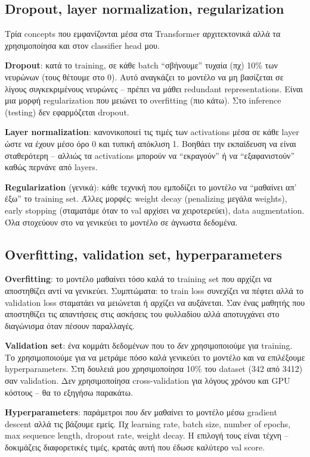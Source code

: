 \documentclass[12pt]{fphw}
\begin{document}
\subsection{Dropout, layer normalization, regularization}

Τρία concepts που εμφανίζονται μέσα στα Transformer αρχιτεκτονικά αλλά τα χρησιμοποίησα και στον classifier head μου.

\textbf{Dropout}: κατά το training, σε κάθε batch ``σβήνουμε'' τυχαία (πχ) 10\% των νευρώνων (τους θέτουμε στο 0). Αυτό αναγκάζει το μοντέλο να μη βασίζεται σε λίγους συγκεκριμένους νευρώνες -- πρέπει να μάθει redundant representations. Είναι μια μορφή regularization που μειώνει το overfitting (πιο κάτω). Στο inference (testing) δεν εφαρμόζεται dropout.

\textbf{Layer normalization}: κανονικοποιεί τις τιμές των activations μέσα σε κάθε layer ώστε να έχουν μέσο όρο 0 και τυπική απόκλιση 1. Βοηθάει την εκπαίδευση να είναι σταθερότερη -- αλλιώς τα activations μπορούν να ``εκραγούν'' ή να ``εξαφανιστούν'' καθώς περνάνε από layers.

\textbf{Regularization} (γενικά): κάθε τεχνική που εμποδίζει το μοντέλο να ``μαθαίνει απ' έξω'' το training set. Άλλες μορφές: weight decay (penalizing μεγάλα weights), early stopping (σταματάμε όταν το val αρχίσει να χειροτερεύει), data augmentation. Όλα στοχεύουν στο να γενικεύει το μοντέλο σε άγνωστα δεδομένα.

\subsection{Overfitting, validation set, hyperparameters}

\textbf{Overfitting}: το μοντέλο μαθαίνει τόσο καλά το training set που αρχίζει να αποστηθίζει αντί να γενικεύει. Συμπτώματα: το train loss συνεχίζει να πέφτει αλλά το validation loss σταματάει να μειώνεται ή αρχίζει να αυξάνεται. Σαν ένας μαθητής που αποστηθίζει τις απαντήσεις στις ασκήσεις του φυλλαδίου αλλά αποτυγχάνει στο διαγώνισμα όταν πέσουν παραλλαγές.

\textbf{Validation set}: ένα κομμάτι δεδομένων που το \emph{δεν} χρησιμοποιούμε για training. Το χρησιμοποιούμε για να μετράμε πόσο καλά γενικεύει το μοντέλο και να επιλέξουμε hyperparameters. Στη δουλειά μου χρησιμοποίησα 10\% του dataset (342 από 3412) σαν validation. Δεν χρησιμοποίησα cross-validation για λόγους χρόνου και GPU κόστους -- θα το εξηγήσω παρακάτω.

\textbf{Hyperparameters}: παράμετροι που \emph{δεν} μαθαίνει το μοντέλο μέσω gradient descent αλλά τις βάζουμε εμείς. Πχ learning rate, batch size, number of epochs, max sequence length, dropout rate, weight decay. Η επιλογή τους είναι τέχνη -- δοκιμάζεις διαφορετικές τιμές, κρατάς αυτή που έδωσε καλύτερο val score.
\end{document}
